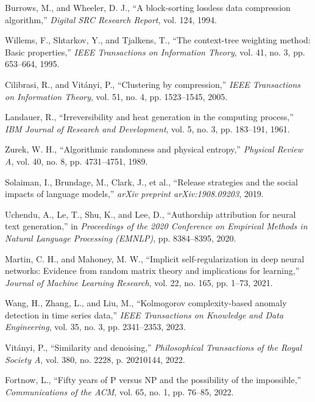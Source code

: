 \documentclass[12pt,a4paper]{report}
\begin{document}
\begin{thebibliography}{99}
Burrows, M., and Wheeler, D. J., ``A block-sorting lossless data compression algorithm,'' \textit{Digital SRC Research Report}, vol. 124, 1994.

Willems, F., Shtarkov, Y., and Tjalkens, T., ``The context-tree weighting method: Basic properties,'' \textit{IEEE Transactions on Information Theory}, vol. 41, no. 3, pp. 653--664, 1995.

Cilibrasi, R., and Vitányi, P., ``Clustering by compression,'' \textit{IEEE Transactions on Information Theory}, vol. 51, no. 4, pp. 1523--1545, 2005.

Landauer, R., ``Irreversibility and heat generation in the computing process,'' \textit{IBM Journal of Research and Development}, vol. 5, no. 3, pp. 183--191, 1961.

Zurek, W. H., ``Algorithmic randomness and physical entropy,'' \textit{Physical Review A}, vol. 40, no. 8, pp. 4731--4751, 1989.

Solaiman, I., Brundage, M., Clark, J., et al., ``Release strategies and the social impacts of language models,'' \textit{arXiv preprint arXiv:1908.09203}, 2019.

Uchendu, A., Le, T., Shu, K., and Lee, D., ``Authorship attribution for neural text generation,'' in \textit{Proceedings of the 2020 Conference on Empirical Methods in Natural Language Processing (EMNLP)}, pp. 8384--8395, 2020.

Martin, C. H., and Mahoney, M. W., ``Implicit self-regularization in deep neural networks: Evidence from random matrix theory and implications for learning,'' \textit{Journal of Machine Learning Research}, vol. 22, no. 165, pp. 1--73, 2021.

Wang, H., Zhang, L., and Liu, M., ``Kolmogorov complexity-based anomaly detection in time series data,'' \textit{IEEE Transactions on Knowledge and Data Engineering}, vol. 35, no. 3, pp. 2341--2353, 2023.

Vitányi, P., ``Similarity and denoising,'' \textit{Philosophical Transactions of the Royal Society A}, vol. 380, no. 2228, p. 20210144, 2022.

Fortnow, L., ``Fifty years of P versus NP and the possibility of the impossible,'' \textit{Communications of the ACM}, vol. 65, no. 1, pp. 76--85, 2022.


\end{thebibliography}
\end{document}
